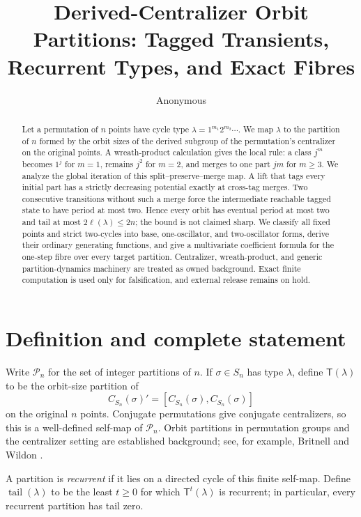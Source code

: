 \documentclass[10pt,a4paper]{amsart}
\title[Derived-centralizer orbit partitions]{Derived-Centralizer Orbit Partitions: Tagged Transients, Recurrent Types, and Exact Fibres}
\author{Anonymous}
\date{}
\theoremstyle{definition}
\theoremstyle{remark}
\newcommand{\Parn}{\mathcal P}
\newcommand{\CT}{\mathsf T}
\begin{document}
\begin{abstract}
Let a permutation of $n$ points have cycle type
$\lambda=1^{m_1}2^{m_2}\cdots$.  We map $\lambda$ to the partition of $n$
formed by the orbit sizes of the derived subgroup of the permutation's
centralizer on the original points.  A wreath-product calculation gives the
local rule: a class $j^m$ becomes $1^j$ for $m=1$, remains $j^2$ for
$m=2$, and merges to one part $jm$ for $m\geq3$.  We analyze the global
iteration of this split--preserve--merge map.  A lift that tags every
initial part has a strictly decreasing potential exactly at cross-tag
merges.  Two consecutive transitions without such a merge force the
intermediate reachable tagged state to have period at most two.  Hence every
orbit has eventual period at most two and tail at most
$2\ell(\lambda)\leq2n$; the bound is not claimed sharp.  We classify all
fixed points and strict two-cycles into base, one-oscillator, and
two-oscillator forms, derive their ordinary generating functions, and give
a multivariate coefficient formula for the one-step fibre over every target
partition.  Centralizer, wreath-product, and generic partition-dynamics
machinery are treated as owned background.  Exact finite computation is
used only for falsification, and external release remains on hold.
\end{abstract}

\maketitle

\section{Definition and complete statement}

Write $\Parn_n$ for the set of integer partitions of $n$.  If
$\sigma\in S_n$ has type $\lambda$, define $\CT(\lambda)$ to be the
orbit-size partition of
\[
                     C_{S_n}(\sigma)'=[C_{S_n}(\sigma),C_{S_n}(\sigma)]
\]
on the original $n$ points.  Conjugate permutations give conjugate
centralizers, so this is a well-defined self-map of $\Parn_n$.  Orbit
partitions in permutation groups and the centralizer setting are established
background; see, for example, Britnell and Wildon
\cite{BritnellWildon2014}.

A partition is \emph{recurrent} if it lies on a directed cycle of this finite
self-map.  Define $\operatorname{tail}(\lambda)$ to be the least $t\geq0$
for which $\CT^t(\lambda)$ is recurrent; in particular, every recurrent
partition has tail zero.
\end{document}
